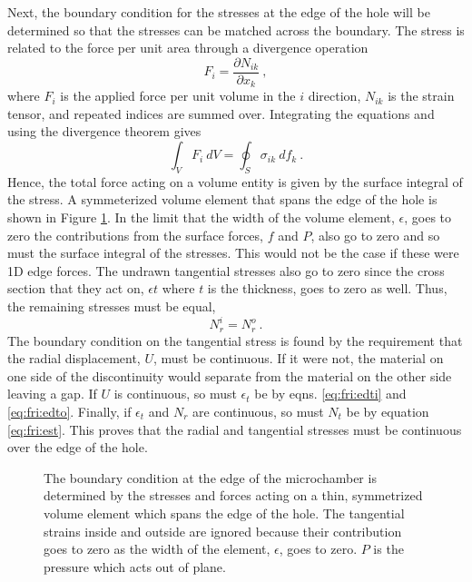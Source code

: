 Next, the boundary condition for the stresses at the edge of the hole will be determined so that the stresses can be matched across the boundary.
The stress is related to the force per unit area through a divergence operation
\begin{equation}
	F_i=\frac{\partial N_{ik}}{\partial x_k} \ ,
\end{equation}
where $F_i$ is the applied force per unit volume in the $i$ direction, $N_{ik}$ is the strain tensor, and repeated indices are summed over.
Integrating the equations and using the divergence theorem gives
\begin{equation}
	\int_V F_i \ dV=\oint_S \sigma_{ik} \ df_k \ .
\end{equation}
Hence, the total force acting on a volume entity is given by the surface integral of the stress.
A symmeterized volume element that spans the edge of the hole is shown in Figure \ref{fig:fri:egestress}.
In the limit that the width of the volume element, $\epsilon$, goes to zero the contributions from the surface forces, $f$ and $P$, also go to zero and so must the surface integral of the stresses.
This would not be the case if these were 1D edge forces.
The undrawn tangential stresses also go to zero since the cross section that they act on, $\epsilon t$ where $t$ is the thickness, goes to zero as well. 
Thus, the remaining stresses must be equal,
\begin{equation}
	N_r^i=N_r^o \ .
\end{equation}
The boundary condition on the tangential stress is found by the requirement that the radial displacement, $U$, must be continuous.
If it were not, the material on one side of the discontinuity would separate from the material on the other side leaving a gap.
If $U$ is continuous, so must $\epsilon_t$ be by eqns. \ref{eq:fri:edti} and \ref{eq:fri:edto}.
Finally, if $\epsilon_t$ and $N_r$ are continuous, so must $N_t$ be by equation \ref{eq:fri:est}.
This proves that the radial and tangential stresses must be continuous over the edge of the hole.

\begin{figure}
	\begin{center}
	
	\end{center}
	\caption[Boundary conditions at the microchamber edge]{\label{fig:fri:egestress}
	The boundary condition at the edge of the microchamber is determined by the stresses and forces acting on a thin, symmetrized volume element which spans the edge of the hole.
	The tangential strains inside and outside are ignored because their contribution goes to zero as the width of the element, $\epsilon$, goes to zero.
	$P$ is the pressure which acts out of plane.}
\end{figure}

